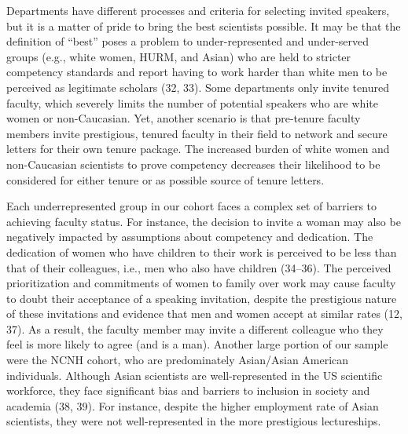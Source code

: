 \documentclass[10pt,]{article}
\begin{document}
Departments have different processes and criteria for selecting invited
speakers, but it is a matter of pride to bring the best scientists
possible. It may be that the definition of ``best'' poses a problem to
under-represented and under-served groups (e.g., white women, HURM, and
Asian) who are held to stricter competency standards and report having
to work harder than white men to be perceived as legitimate scholars
(32, 33). Some departments only invite tenured faculty, which severely
limits the number of potential speakers who are white women or
non-Caucasian. Yet, another scenario is that pre-tenure faculty members
invite prestigious, tenured faculty in their field to network and secure
letters for their own tenure package. The increased burden of white
women and non-Caucasian scientists to prove competency decreases their
likelihood to be considered for either tenure or as possible source of
tenure letters.

Each underrepresented group in our cohort faces a complex set of
barriers to achieving faculty status. For instance, the decision to
invite a woman may also be negatively impacted by assumptions about
competency and dedication. The dedication of women who have children to
their work is perceived to be less than that of their colleagues, i.e.,
men who also have children (34--36). The perceived prioritization and
commitments of women to family over work may cause faculty to doubt
their acceptance of a speaking invitation, despite the prestigious
nature of these invitations and evidence that men and women accept at
similar rates (12, 37). As a result, the faculty member may invite a
different colleague who they feel is more likely to agree (and is a
man). Another large portion of our sample were the NCNH cohort, who are
predominately Asian/Asian American individuals. Although Asian
scientists are well-represented in the US scientific workforce, they
face significant bias and barriers to inclusion in society and academia
(38, 39). For instance, despite the higher employment rate of Asian
scientists, they were not well-represented in the more prestigious
lectureships.
\end{document}
